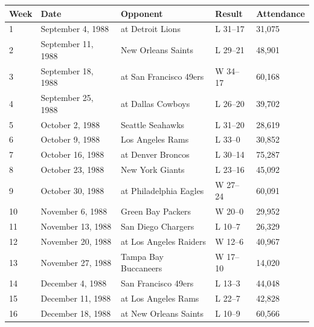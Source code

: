 \documentclass{article}
\begin{document}
\begin{tabular}{lllll}
\toprule
Week & Date & Opponent & Result & Attendance \\
\midrule
1 & September 4, 1988 & at Detroit Lions & L 31–17 & 31,075 \\
2 & September 11, 1988 & New Orleans Saints & L 29–21 & 48,901 \\
3 & September 18, 1988 & at San Francisco 49ers & W 34–17 & 60,168 \\
4 & September 25, 1988 & at Dallas Cowboys & L 26–20 & 39,702 \\
5 & October 2, 1988 & Seattle Seahawks & L 31–20 & 28,619 \\
6 & October 9, 1988 & Los Angeles Rams & L 33–0 & 30,852 \\
7 & October 16, 1988 & at Denver Broncos & L 30–14 & 75,287 \\
8 & October 23, 1988 & New York Giants & L 23–16 & 45,092 \\
9 & October 30, 1988 & at Philadelphia Eagles & W 27–24 & 60,091 \\
10 & November 6, 1988 & Green Bay Packers & W 20–0 & 29,952 \\
11 & November 13, 1988 & San Diego Chargers & L 10–7 & 26,329 \\
12 & November 20, 1988 & at Los Angeles Raiders & W 12–6 & 40,967 \\
13 & November 27, 1988 & Tampa Bay Buccaneers & W 17–10 & 14,020 \\
14 & December 4, 1988 & San Francisco 49ers & L 13–3 & 44,048 \\
15 & December 11, 1988 & at Los Angeles Rams & L 22–7 & 42,828 \\
16 & December 18, 1988 & at New Orleans Saints & L 10–9 & 60,566 \\
\bottomrule
\end{tabular}
\end{document}
